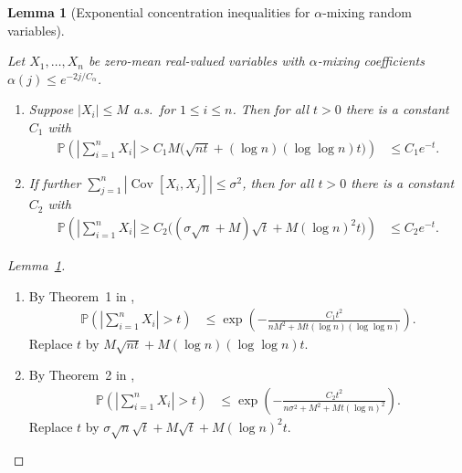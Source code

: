 \documentclass[11pt,lof]{puthesis}
\renewcommand{\P}{\ensuremath{\mathbb{P}}}
\DeclareMathOperator{\Cov}{Cov}
\theoremstyle{break}
\newtheorem{lemma}{Lemma}[section]
\theoremstyle{proof}
\newtheorem{proof}{Proof}
\begin{document}
\begin{lemma}[Exponential concentration inequalities for
\texorpdfstring{$\alpha$}{alpha}-mixing random variables]
\label{lem:yurinskii_app_exponential_mixing}

Let $X_1, \ldots, X_n$ be zero-mean real-valued
variables with $\alpha$-mixing coefficients
$\alpha(j) \leq e^{-2 j / C_\alpha}$.

\begin{enumerate}[label=(\roman*)]

\item
\label{it:yurinskii_app_exponential_mixing_bounded}
Suppose $|X_i| \leq M$ a.s.\ for $1 \leq i \leq n$.
Then for all $t > 0$ there is a constant $C_1$ with
%
\begin{align*}
\P\left(
\left|
\sum_{i=1}^n
X_i
\right|
> C_1 M \big( \sqrt{n t}
+ (\log n)(\log \log n) t \big)
\right)
&\leq
C_1 e^{-t}.
\end{align*}
%
\item
\label{it:yurinskii_app_exponential_mixing_bernstein}
If further $\sum_{j=1}^n |\Cov[X_i, X_j]| \leq \sigma^2$,
then for all $t > 0$ there is a constant $C_2$ with
%
\begin{align*}
\P\left(
\left|
\sum_{i=1}^n
X_i
\right|
\geq C_2 \big( (\sigma \sqrt n + M) \sqrt t
+ M (\log n)^2 t \big)
\right)
&\leq
C_2 e^{-t}.
\end{align*}

\end{enumerate}

\end{lemma}

\begin{proof}[Lemma~\ref{lem:yurinskii_app_exponential_mixing}]

\begin{enumerate}[label=(\roman*)]

\item
By Theorem~1 in \citet{merlevede2009bernstein},
%
\begin{align*}
\P\left(
\left|
\sum_{i=1}^n
X_i
\right|
> t
\right)
&\leq
\exp\left(
-\frac{C_1 t^2}{n M^2 + Mt (\log n)(\log\log n)}
\right).
\end{align*}
%
Replace $t$ by
$M \sqrt{n t} + M (\log n)(\log \log n) t$.

\item
By Theorem~2 in \citet{merlevede2009bernstein},
%
\begin{align*}
\P\left(
\left|
\sum_{i=1}^n
X_i
\right|
> t
\right)
&\leq
\exp\left(
-\frac{C_2 t^2}{n\sigma^2 + M^2 + Mt (\log n)^2}
\right).
\end{align*}
%
Replace $t$ by
$\sigma \sqrt n \sqrt t + M \sqrt t + M (\log n)^2 t$.
\end{enumerate}
%
\end{proof}
\end{document}
